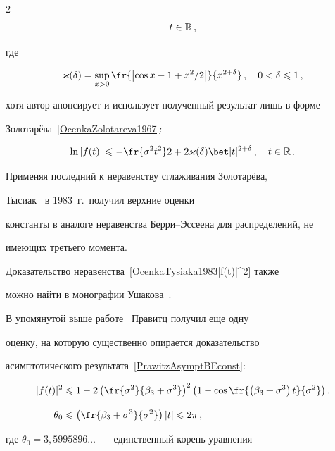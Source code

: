 \begin{multicols}{2}
\begin{multline}
t\in\R\,,

\end{multline}

где

$$

\varkappa(\d)=\sup_{x>0}\fr{\left|\cos

x-1+x^2/2\right|}{x^{2+\d}}\,,\quad  0<\d\le 1\,,

$$

хотя автор анонсирует и использует полученный результат лишь в форме

Золотарёва~\eqref{OcenkaZolotareva1967}:

$$

\ln |f(t)|\le-\fr{\sigma^2t^2}2+ 2\varkappa(\d)\bet|t|^{2+\d}\,,\quad

t\in\R\,.

$$

Применяя последний к неравенству сглаживания Золотарёва,

Тысиак~\cite{Tysiak1983} в 1983~г.\ получил верхние оценки

константы в аналоге неравенства Берри--Эссеена для распределений, не

имеющих третьего момента.

Доказательство неравенства~\eqref{OcenkaTysiaka1983|f(t)|^2} также

можно найти в монографии Ушакова~\cite{Ushakov1999}.



В упомянутой выше работе~\cite{Prawitz1973} Правитц получил еще одну

оценку, на которую существенно опирается доказательство

асимптотического результата~\eqref{PrawitzAsymptBEconst}:

\begin{align}

|f(t)|^2 & \le 1- 2 \left(\fr{\sigma^2}{\beta_3+\sigma^3}\right)^2

\left(1-\cos\fr{\left(\beta_3+ \sigma^3\right)t}{\sigma^2}

\right),\notag\\

&\label{OcenkaPrawitza|f(t)|^2cos} \\[-6pt]

\theta_0 &\le \left(\fr{\beta_3+\sigma^3}{\sigma^2}\right)|t| \le 2\pi\,,\notag

\end{align}

где $\theta_0=3{,}5995896\ldots$~--- единственный корень уравнения


\end{multicols}
